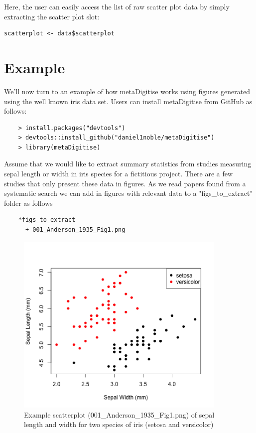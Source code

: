 \documentclass{article}
\begin{document}
Here, the user can easily access the list of raw scatter plot data by simply extracting the scatter plot slot:

\begin{verbatim}
scatterplot <- data$scatterplot
\end{verbatim}


\section{Example}
We'll now turn to an example of how metaDigitise works using figures generated using the well known iris data set. Users can install metaDigitise from GitHub as follows:

\begin{verbatim}
	> install.packages("devtools")
	> devtools::install_github("daniel1noble/metaDigitise")
	> library(metaDigitise)
\end{verbatim}

Assume that we would like to extract summary statistics from studies measuring sepal length or width in iris species for a fictitious project. There are a few studies that only present these data in figures. As we read papers found from a systematic search we can add in figures with relevant data to a "figs\_to\_extract" folder as follows

\begin{lstlisting}
	*figs_to_extract
      + 001_Anderson_1935_Fig1.png
\end{lstlisting}

\begin{figure}[!h] 
 \includegraphics[width=0.9\textwidth]{001_Anderson_1935_Fig1.png} 
 \caption{Example scatterplot (001\_Anderson\_1935\_Fig1.png) of sepal length and width for two species of iris (setosa and versicolor)}
\label{fig:rotate}
\end{figure}
\end{document}

